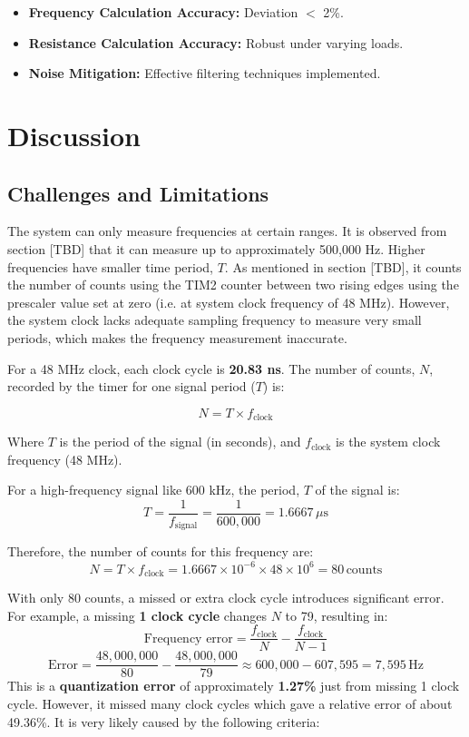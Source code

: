 \documentclass[12pt]{article}
\begin{document}
\begin{itemize}[leftmargin=2em]
    \item \textbf{Frequency Calculation Accuracy:} Deviation $<$ 2\%.
    \item \textbf{Resistance Calculation Accuracy:} Robust under varying loads.
    \item \textbf{Noise Mitigation:} Effective filtering techniques implemented.
\end{itemize}



\section{Discussion}
\subsection{Challenges and Limitations}

The system can only measure frequencies at certain ranges. It is observed from section [TBD] that it can measure up to approximately 500,000 Hz. Higher frequencies have smaller time period, $T$. As mentioned in section [TBD], it counts the number of counts using the TIM2 counter between two rising edges using the prescaler value set at zero (i.e. at system clock frequency of 48 MHz).  However, the system clock lacks adequate sampling frequency to measure very small periods, which makes the frequency measurement inaccurate.

For a 48 MHz clock, each clock cycle is \textbf{20.83 ns}. The number of counts, \( N \), recorded by the timer for one signal period ($T$) is:

\begin{equation}\label{number_of_counts}
    N = T \times f_{\text{clock}}
\end{equation}

Where $T$ is the period of the signal (in seconds), and $f_{\text{clock}}$ is the system clock frequency (48 MHz).

For a high-frequency signal like 600 kHz, the period, $T$ of the signal is:
$$T = \frac{1}{f_{\text{signal}}} = \frac{1}{600,000} = 1.6667 \, \mu\text{s}$$

Therefore, the number of counts for this frequency are:
$$N = T \times f_{\text{clock}} = 1.6667 \times 10^{-6} \times 48 \times 10^6 = 80 \, \text{counts}$$

With only 80 counts, a missed or extra clock cycle introduces significant error. For example, a missing \textbf{1 clock cycle} changes $N$ to 79, resulting in:
    \[
    \text{Frequency error} = \frac{f_{\text{clock}}}{N} - \frac{f_{\text{clock}}}{N-1}
    \]
    \[
    \text{Error} = \frac{48,000,000}{80} - \frac{48,000,000}{79} \approx 600,000 - 607,595 = 7,595 \, \text{Hz}
    \]
This is a \textbf{quantization error} of approximately \textbf{1.27\%} just from missing 1 clock cycle. However, it missed many clock cycles which gave a relative error of about 49.36\%. It is very likely caused by the following criteria:
\end{document}
